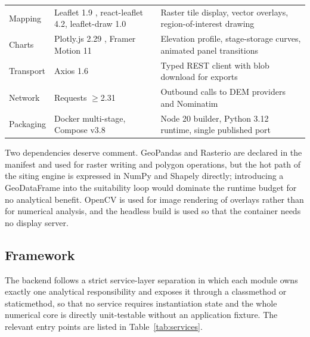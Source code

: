 \documentclass[sigconf,review,10pt]{acmart}
\begin{document}
\begin{table}[t]
\begin{tabular}{@{}R{2.5cm}R{4.0cm}R{10.0cm}@{}}
Mapping & Leaflet 1.9 \cite{leaflet}, react-leaflet 4.2, leaflet-draw 1.0 & Raster tile display, vector overlays, region-of-interest drawing \\
Charts & Plotly.js 2.29 \cite{plotly}, Framer Motion 11 & Elevation profile, stage-storage curves, animated panel transitions \\
Transport & Axios 1.6 & Typed REST client with blob download for exports \\
Network & Requests $\ge$2.31 & Outbound calls to DEM providers \cite{overpass,openmeteo} and Nominatim \\
Packaging & Docker multi-stage, Compose v3.8 \cite{docker} & Node 20 builder, Python 3.12 runtime, single published port \\
\bottomrule
\end{tabular}
\end{table}

Two dependencies deserve comment. GeoPandas and Rasterio are declared in
the manifest and used for raster writing and polygon operations, but the
hot path of the siting engine is expressed in NumPy and Shapely directly;
introducing a GeoDataFrame into the suitability loop would dominate the
runtime budget for no analytical benefit. OpenCV is used for image
rendering of overlays rather than for numerical analysis, and the
headless build is used so that the container needs no display server.

\subsection{Framework}

The backend follows a strict service-layer separation in which each module
owns exactly one analytical responsibility and exposes it through a
classmethod or staticmethod, so that no service requires instantiation
state and the whole numerical core is directly unit-testable without an
application fixture. The relevant entry points are listed in
Table~\ref{tab:services}.
\end{document}
